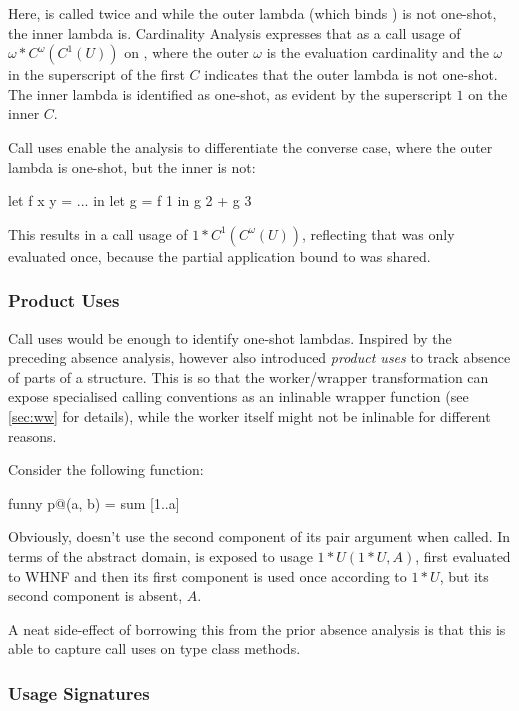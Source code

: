 Here,  is called twice and while the outer lambda (which binds ) is not one-shot, the inner lambda is.
Cardinality Analysis expresses that as a call usage of $\omega*C^\omega(C^1(U))$ on , where the outer $\omega$ is the evaluation cardinality and the $\omega$ in the superscript of the first $C$ indicates that the outer lambda is not one-shot.
The inner lambda is identified as one-shot, as evident by the superscript $1$ on the inner $C$.

Call uses enable the analysis to differentiate the converse case, where the outer lambda is one-shot, but the inner is not:
\begin{haskellcode}
  let f x y = ...
  in let g = f 1
     in g 2 + g 3
\end{haskellcode}

This results in a call usage of $1*C^1(C^\omega(U))$, reflecting that  was only evaluated once, because the partial application bound to  was shared.

\subsubsection{Product Uses}

Call uses would be enough to identify one-shot lambdas.
Inspired by the preceding absence analysis, \textcite{card} however also introduced \emph{product uses} to track absence of parts of a structure.
This is so that the worker/wrapper transformation can expose specialised calling conventions as an inlinable wrapper function (see \cref{sec:ww} for details), while the worker itself might not be inlinable for different reasons.

Consider the following  function:
\begin{haskellcode}
  funny p@(a, b) = sum [1..a]
\end{haskellcode}

Obviously,  doesn't use the second component of its pair argument when called.
In terms of the abstract domain,  is exposed to usage $1*U(1*U, A)$, \eg first evaluated to WHNF and then its first component is used once according to $1*U$, but its second component is absent, $A$.

A neat side-effect of borrowing this from the prior absence analysis is that this is able to capture call uses on type class methods.

\subsubsection{Usage Signatures}


